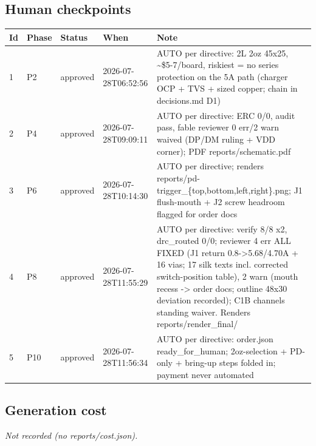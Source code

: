 \documentclass[11pt,a4paper]{article}
\begin{document}
\subsection*{Human checkpoints}
{\small
\begin{longtable}{lllp{2.6cm}p{6.4cm}}
\toprule
\textbf{Id} & \textbf{Phase} & \textbf{Status} & \textbf{When} & \textbf{Note} \\
\midrule
\endhead
1 & P2 & approved & 2026-07-28T06:52:56 & AUTO per directive: 2L 2oz 45x25, \textasciitilde{}\$5-7/board, riskiest = no series protection on the 5A path (charger OCP + TVS + sized copper; chain in decisions.md D1) \\
2 & P4 & approved & 2026-07-28T09:09:11 & AUTO per directive: ERC 0/0, audit pass, fable reviewer 0 err/2 warn waived (DP/DM ruling + VDD corner); PDF reports/schematic.pdf \\
3 & P6 & approved & 2026-07-28T10:14:30 & AUTO per directive; renders reports/pd-trigger\_\{top,bottom,left,right\}.png; J1 flush-mouth + J2 screw headroom flagged for order docs \\
4 & P8 & approved & 2026-07-28T11:55:29 & AUTO per directive: verify 8/8 x2, drc\_routed 0/0; reviewer 4 err ALL FIXED (J1 return 0.8-\textgreater{}5.68/4.70A + 16 vias; 17 silk texts incl. corrected switch-position table), 2 warn (mouth recess -\textgreater{} order docs; outline 48x30 deviation recorded); C1B channels standing waiver. Renders reports/render\_final/ \\
5 & P10 & approved & 2026-07-28T11:56:34 & AUTO per directive: order.json ready\_for\_human; 2oz-selection + PD-only + bring-up steps folded in; payment never automated \\
\bottomrule
\end{longtable}
}
\subsection*{Generation cost}
\emph{Not recorded (no reports/cost.json).}
\end{document}

